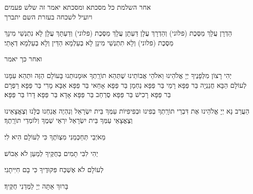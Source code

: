 \clearpage

\thispagestyle{empty}
\centerlastline
\small
\parskip 1pt
{\centering
  \scriptsize
   אחר השלמת כל מסכתא ומסכתא יאמר זה שלש פעמים\\ ויועיל לשכחה בעזרת השם יתברך\hdot
}

הַדְרָן עֲלָךְ מַסֶּכֶת {\scriptsize(פלוני)} וְהַדְרָךְ עֲלָן\hdot
דַּעְתָן עֲלָךְ מַסֶּכֶת {\scriptsize(פלוני)} וְדַעְתָּךְ עֲלָן\hdot
לָא נִתְנְשֵׁי מִינָךְ מַסֶּכֶת {\scriptsize(פלוני}) וְלָא תִתְנְשֵׁי מִינָן
לָא בְעַלְמָא הַדֵּין וְלָא בְעַלְמָא דְאָתֵי׃

\vspace*{1em}

{\scriptsize ואחר כך יאמר}

יְהִי רָצוֹן מִלְּפָנֶיךָ יְיָ אֱלֹהֵינוּ וֵאלֹהֵי אֲבוֹתֵינוּ שֶׁתְּהֵא תוֹרָֽתְךָ אוּמָנוּתֵנוּ בָּעוֹלָם הַזֶּה וּתְהֵא עִמָּנו לְעוֹלָם הַבָּא\hdot
חֲנַנְיָה בַּר פַּפָּא\hdot
רָמֵי בַּר פַּפָּא\hdot
נַחְמָן בַּר פַּפָּא\hdot
אָחַאי בַּר פַּפָּא\hdot
אַבָּא מָרִי בַּר פַּפָּא\hdot
רַפְרָם בַּר פַּפָּא\hdot
רָכִישׁ בַּר פַּפָּא\hdot
סֻרְחַב בַּר פַּפָּא\hdot
אָדָא בַּר פַּפָּא\hdot
דָרוֹ בַּר פַּפָּא׃

\vspace*{1em}

הַעֲרֵב נָא יְיָ אֱלֹהֵינוּ אֶת דִּבְרֵי תוֹרָֽתְךָ בְפִינוּ וּבְפִיפִיּוֹת עַמְּךָ בֵּית יִשְׂרָאֵל וְנִהְיֶה אֲנַחְנוּ כֻּלָּנוּ וְצֶאֱצָאֵינוּ וְצֶאֱצָאֵי עַמְּךָ בֵּית יִשְׂרָאֵל יִרְאֵי שְׁמֶךָ וְלוֹמְדֵי תוֹרָֽתֶךָ׃

מֵאֹיְבַי תְּחַכְּמֵנִי מִצְוֺתֶךָ כִּי לְעוֹלָם הִיא לִי׃

יְהִי לִבִּי תָמִים בְּחֻקֶּיךָ לְמַעַן לֹא אֵבוֹשׁ׃

לְעוֹלָם לֹא אֶשְׁכַּח פִּקּוּדֶיךָ כִּי בָם חִיִּיתָנִי׃

  בָּרוּךְ אַתָּה יְיָ לַמְּדֵנִי חֻקֶּיךָ׃

